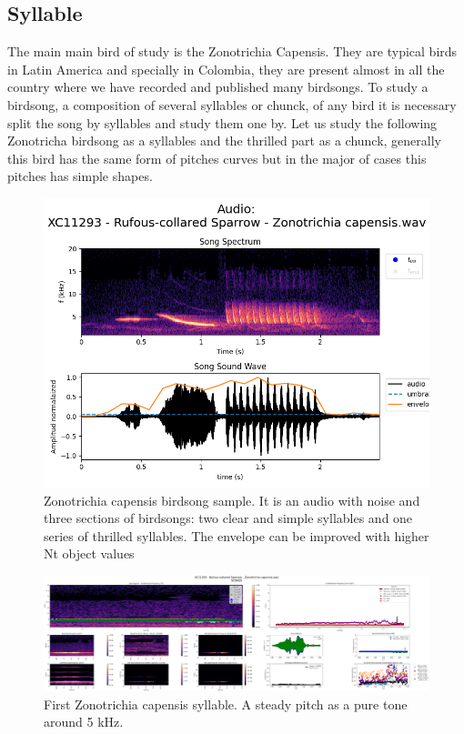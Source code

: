 \subsection{Syllable}

The main main bird of study is the Zonotrichia Capensis. They are typical birds in Latin America and specially in Colombia, they are present almost in all the country where we have recorded and published many birdsongs. To study a birdsong, a composition of several syllables or chunck, of any bird it is necessary split the song by syllables and study them one by. Let us study the following Zonotricha birdsong as a syllables and the thrilled part as a chunck, generally this bird has the same form of pitches curves but in the major of cases this pitches has simple shapes.

\begin{figure}[H]
    \centering
    \includegraphics[width=1\linewidth]{Images/Birdsong-XC11293.png}
    \caption{Zonotrichia capensis birdsong sample. It is an audio with noise and three sections of birdsongs: two clear and simple syllables and one series of thrilled syllables. The envelope can be improved with higher Nt object values}
    \label{fig:zonotrichia_all}
\end{figure}


\begin{figure}[H]
    \centering
    \includegraphics[width=1\linewidth]{Images/ScoresVariables-syllable-XC11293 - Rufous-collared Sparrow - Zonotrichia capensis.wav-1.png}
    \caption{First Zonotrichia capensis syllable. A steady pitch as a pure tone around 5 kHz.}
    \label{fig:zonotrichia_1}
\end{figure}

